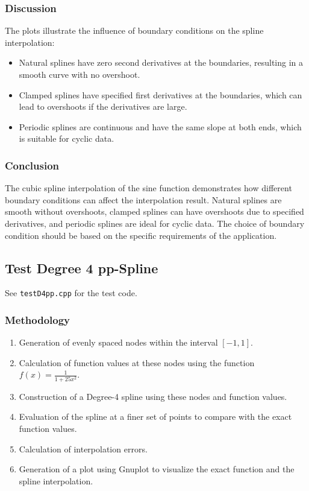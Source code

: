 \documentclass{article}
\begin{document}
\subsubsection{Discussion}
The plots illustrate the influence of boundary conditions on the spline interpolation:
\begin{itemize}
    \item Natural splines have zero second derivatives at the boundaries, resulting in a smooth curve with no overshoot.
    \item Clamped splines have specified first derivatives at the boundaries, which can lead to overshoots if the derivatives are large.
    \item Periodic splines are continuous and have the same slope at both ends, which is suitable for cyclic data.
\end{itemize}

\subsubsection{Conclusion}
The cubic spline interpolation of the sine function demonstrates how different boundary conditions can affect the interpolation result. Natural splines are smooth without overshoots, clamped splines can have overshoots due to specified derivatives, and periodic splines are ideal for cyclic data. The choice of boundary condition should be based on the specific requirements of the application.


\subsection{Test Degree 4 pp-Spline}
See \texttt{testD4pp.cpp} for the test code.
\subsubsection{Methodology}
\begin{enumerate}
    \item Generation of evenly spaced nodes within the interval \([-1, 1]\).
    \item Calculation of function values at these nodes using the function \( f(x) = \frac{1}{1 + 25x^2} \).
    \item Construction of a Degree-4 spline using these nodes and function values.
    \item Evaluation of the spline at a finer set of points to compare with the exact function values.
    \item Calculation of interpolation errors.
    \item Generation of a plot using Gnuplot to visualize the exact function and the spline interpolation.
\end{enumerate}
\end{document}
